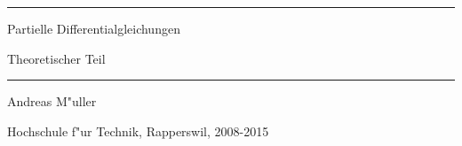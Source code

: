\documentclass[a4paper]{book}
\begin{document}
\pagestyle{fancy}
\lhead{}
\rhead{}
\frontmatter
\newcommand\HRule{\noindent\rule{\linewidth}{1.5pt}}
\begin{titlepage}
\HRule
\vspace*{10pt}
\begin{flushright}
{\Huge
Partielle Differentialgleichungen}
\end{flushright}
\begin{flushright}
{\Large Theoretischer Teil}
\end{flushright}
\HRule
\begin{flushright}
\vspace{30pt}
\LARGE
Andreas M"uller
\end{flushright}
\begin{center}
Hochschule f"ur Technik, Rapperswil, 2008-2015
\end{center}
\end{titlepage}
\hypersetup{
    colorlinks=true,
    linktoc=all,
    linkcolor=blue
}
\tableofcontents
\newtheorem{satz}{Satz}[chapter]
\newtheorem{problem}[satz]{Problem}
\newtheorem{hilfssatz}[satz]{Hilfssatz}
\newtheorem{definition}[satz]{Definition}
\newtheorem{annahme}[satz]{Annahme}
\newtheorem{aufgabe}[satz]{Aufgabe}
\newenvironment{beispiel}[1][Beispiel]{%
\begin{proof}[#1]%
\renewcommand{\qedsymbol}{$\bigcirc$}
}{\end{proof}}
\mainmatter












\appendix

%

\end{document}
